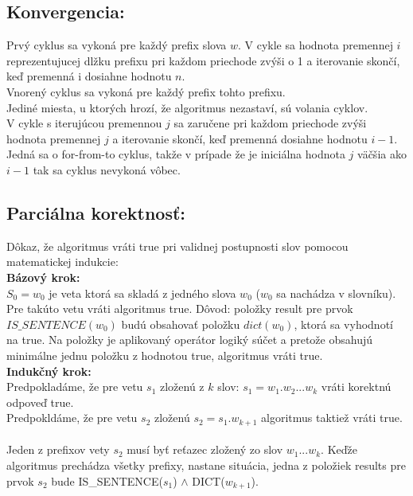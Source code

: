 \documentclass[paper=a4, fontsize=11pt]{scrartcl} %
\numberwithin{equation}{section} %
\numberwithin{figure}{section} %
\numberwithin{table}{section} %
\begin{document}
\subsection*{Konvergencia:}
Prvý cyklus sa vykoná pre každý prefix slova $w$.
V cykle sa hodnota premennej $i$ reprezentujucej dlžku prefixu pri každom priechode zvýši o 1 a iterovanie skončí, keď premenná i dosiahne hodnotu $n$. \ \\

Vnorený cyklus sa vykoná pre každý prefix tohto prefixu. \ \\

Jediné miesta, u ktorých hrozí, že algoritmus nezastaví, sú volania cyklov. \ \\

V cykle s iterujúcou premennou $j$ sa zaručene pri každom priechode zvýši hodnota premennej $j$ a iterovanie skončí, keď premenná dosiahne hodnotu $i-1$. Jedná sa o for-from-to cyklus, takže v prípade že je iniciálna hodnota $j$ väčšia ako $i-1$ tak sa cyklus nevykoná vôbec.

\subsection*{Parciálna korektnosť:}
Dôkaz, že algoritmus vráti true pri validnej postupnosti slov pomocou matematickej indukcie: \ \\

\textbf{Bázový krok:} \ \\
 $S_0 = w_0$ je veta ktorá sa skladá z jedného slova $w_0$ ($w_0$ sa nachádza v slovníku). Pre takúto vetu vráti algoritmus true. Dôvod: položky result pre prvok $IS\_SENTENCE(w_0)$ budú obsahovať položku $dict(w_0)$, ktorá sa vyhodnotí na true. Na položky je aplikovaný operátor logiký súčet a pretože obsahujú minimálne jednu položku z hodnotou true, algoritmus vráti true. \ \\
	
\textbf{Indukčný krok:} \ \\
Predpokladáme, že pre vetu $s_1$ zloženú z $k$ slov: $s_1 = w_1.w_2...w_k$ vráti korektnú odpoveď true. \ \\

Predpokldáme, že pre vetu $s_2$ zloženú $s_2 = s_1.w_{k +1}$ algoritmus taktiež vráti true. \ \\

Jeden z prefixov vety $s_2$ musí byť reťazec zložený zo slov $w_1...w_k$.
Keďže algoritmus prechádza všetky prefixy, nastane situácia, jedna z položiek results pre prvok $s_2$ bude IS\_SENTENCE($s_1$) $\wedge$ DICT($w_{k+1}$).
	
\end{document}
